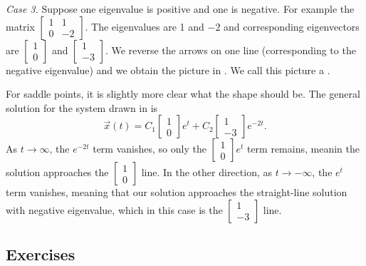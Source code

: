 \medskip

\emph{Case 3.} Suppose one eigenvalue is positive and one is negative.
For example the matrix
$\left[ \begin{smallmatrix} 1 & 1 \\ 0 & -2 \end{smallmatrix} \right]$.
The eigenvalues are 1 and $-2$ and corresponding eigenvectors are
$\left[ \begin{smallmatrix} 1 \\ 0 \end{smallmatrix} \right]$ and
$\left[ \begin{smallmatrix} 1 \\ -3 \end{smallmatrix} \right]$.  We reverse
the arrows on one line (corresponding to the negative eigenvalue) and we
obtain the picture in .  We call this picture a
\emph{}.

For saddle points, it is slightly more clear what the shape should be. The general solution for the system drawn in  is \[ \vec{x}(t) = C_1 \begin{bmatrix} 1 \\ 0 \end{bmatrix}e^t + C_2 \begin{bmatrix} 1 \\ -3 \end{bmatrix}e^{-2t}.\] As $t\rightarrow \infty$, the $e^{-2t}$ term vanishes, so only the $\left[\begin{smallmatrix} 1 \\ 0 \end{smallmatrix}\right]e^t $ term remains, meanin the solution approaches the $\left[\begin{smallmatrix} 1 \\ 0 \end{smallmatrix}\right]$  line. In the other direction, as $t \rightarrow -\infty$, the $e^t$ term vanishes, meaning that our solution approaches the straight-line solution with negative eigenvalue, which in this case is the $\left[\begin{smallmatrix} 1 \\ -3 \end{smallmatrix}\right]$ line. 


\subsection{Exercises}

